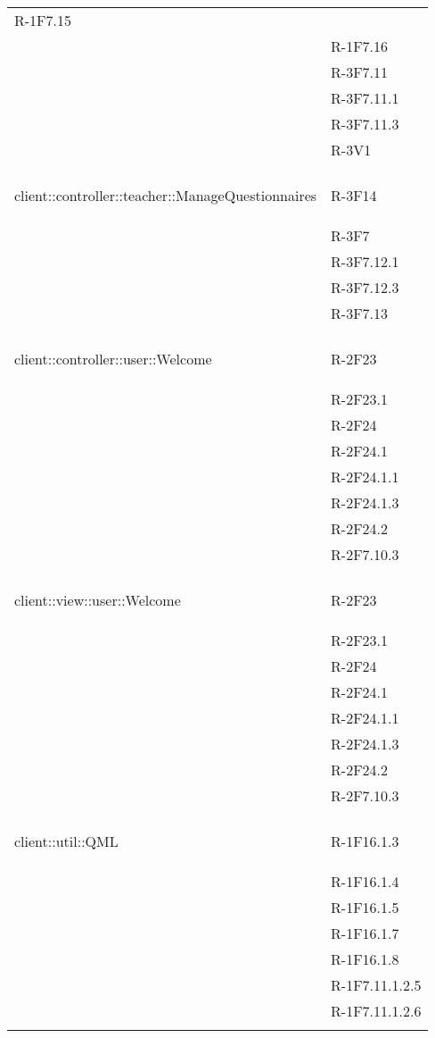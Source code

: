 \begin{longtable}{l p{3cm}}
	R-1F7.15 \tabularnewline &
	
	R-1F7.16 \tabularnewline &
	
	R-3F7.11 \tabularnewline &
	
	R-3F7.11.1 \tabularnewline &
	
	R-3F7.11.3 \tabularnewline &
	
	R-3V1 \tabularnewline &\tabularnewline
	\hline
	\hypertarget{client::controller::teacher::ManageQuestionnaires}{client::controller::teacher::ManageQuestionnaires} & R-3F14 \tabularnewline &
	
	R-3F7 \tabularnewline &
	
	R-3F7.12.1 \tabularnewline &
	
	R-3F7.12.3 \tabularnewline &
	
	R-3F7.13 \tabularnewline &\tabularnewline
	\hline
	\hypertarget{client::controller::user::Welcome}{client::controller::user::Welcome} & R-2F23 \tabularnewline &
	
	R-2F23.1 \tabularnewline &
	
	R-2F24 \tabularnewline &
	
	R-2F24.1 \tabularnewline &
	
	R-2F24.1.1 \tabularnewline &
	
	R-2F24.1.3 \tabularnewline &
	
	R-2F24.2 \tabularnewline &
	
	R-2F7.10.3 \tabularnewline &\tabularnewline
	\hline
	\hypertarget{client::view::user::Welcome}{client::view::user::Welcome} & R-2F23 \tabularnewline &
	
	R-2F23.1 \tabularnewline &
	
	R-2F24 \tabularnewline &
	
	R-2F24.1 \tabularnewline &
	
	R-2F24.1.1 \tabularnewline &
	
	R-2F24.1.3 \tabularnewline &
	
	R-2F24.2 \tabularnewline &
	
	R-2F7.10.3 \tabularnewline &\tabularnewline
	\hline
	\hypertarget{client::util::QML}{client::util::QML} & R-1F16.1.3 \tabularnewline &
	
	R-1F16.1.4 \tabularnewline &
	
	R-1F16.1.5 \tabularnewline &
	
	R-1F16.1.7 \tabularnewline &
	
	R-1F16.1.8 \tabularnewline &
	
	R-1F7.11.1.2.5 \tabularnewline &
	
	R-1F7.11.1.2.6 \tabularnewline &
	

\end{longtable}

